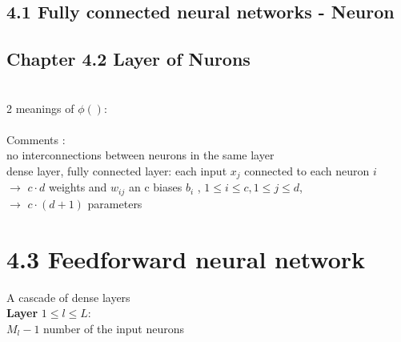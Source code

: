 \subsection{4.1 Fully connected neural networks - Neuron}
\subsection{Chapter 4.2 Layer of Nurons}
\\
2 meanings of $\phi ()$: \\
 \\
Comments : \\
\textbullet no interconnections between neurons in the same layer \\
\textbullet dense layer, fully connected layer:
\qquad \textbullet each input $ x_j$ connected to each neuron $i$ \\
$\rightarrow$ $c \cdot d$ weights and $w_ {ij }$ an c biases $b_i$ , $1 \leq i \leq c, 1 \leq j \leq d$, \\
$\rightarrow$ $ c \cdot (d+1)$ parameters
\section{4.3 Feedforward neural network}
A cascade of dense layers \\
\textbf{Layer } $ 1 \leq l \leq L:$ \\
$M_l -1 $ number of the input neurons \\
 \\
